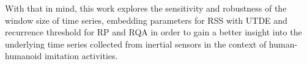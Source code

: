 \documentclass[fleqn,10pt]{wlscirep}
\begin{document}
With that in mind, this work explores the sensitivity and robustness 
of the window size of time series, embedding parameters for RSS with UTDE 
and recurrence threshold for RP and RQA in order to gain a better insight 
into the underlying time series collected from inertial sensors in the 
context of human-humanoid imitation activities.








\end{document}
